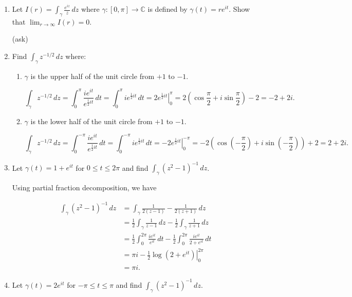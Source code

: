 \documentclass[11pt,oneside,english]{amsart}
\theoremstyle{definition}
\newcommand{\lom}[2]{\lim_{{#1}\rightarrow{#2}}}
\newcommand{\MB}[1]{\mathbb{#1}}
\begin{document}
\begin{enumerate}[leftmargin=*]
\item Let $\displaystyle I(r)=\int_\gamma\frac{e^{iz}}{z}\,dz$ where $\gamma:[0,\pi]\to\MB{C}$ is defined by $\gamma(t)=re^{it}$. Show that $\lom{r}{\infty} I(r)=0$.

(ask)

\item Find $\displaystyle \int_\gamma z^{-1/2}\,dz$ where:
\begin{enumerate}
\itemsep5mm
\item $\gamma$ is the upper half of the unit circle from $+1$ to $-1$.

\[
\int_\gamma z^{-1/2}\,dz=\int_0^\pi\frac{ie^{it}}{e^{\frac{1}{2}it}}\,dt=\int_0^\pi i e^{\frac{1}{2}it}\,dt=\left.2e^{\frac{1}{2}it}\right|_0^\pi=2\left(\cos\frac{\pi}{2}+i\sin\frac{\pi}{2}\right)-2=-2+2i.
\]

\item $\gamma$ is the lower half of the unit circle from $+1$ to $-1$.

\[
\int_\gamma z^{-1/2}\,dz=\int_0^{-\pi}\frac{ie^{it}}{e^{\frac{1}{2}it}}\,dt=\int_0^{-\pi} i e^{\frac{1}{2}it}\,dt=\left.-2e^{\frac{1}{2}it}\right|_0^{-\pi}=-2\left(\cos\left(-\frac{\pi}{2}\right)+i\sin\left(-\frac{\pi}{2}\right)\right)+2=2+2i.
\]

\end{enumerate}

\pagebreak

\setcounter{enumi}{19}

\item Let $\gamma(t)=1+e^{it}$ for $0\leq t\leq 2\pi$ and find $\int_\gamma (z^2-1)^{-1}\,dz$.

Using partial fraction decomposition, we have

\begin{align*}
\int_\gamma (z^2-1)^{-1}\,dz&=\int_\gamma\frac{1}{2(z-1)}-\frac{1}{2(z+1)}\,dz\\[2mm]
&=\frac{1}{2}\int_\gamma\frac{1}{z-1}\,dz-\frac{1}{2}\int_\gamma\frac{1}{z+1}\,dz\\[2mm]
&=\frac{1}{2}\int_0^{2\pi}\frac{ie^{it}}{e^{it}}\,dt-\frac{1}{2}\int_0^{2\pi}\frac{ie^{it}}{2+e^{it}}\,dt\\[2mm]
&=\pi i-\frac{1}{2}\left.\log(2+e^{it})\right|_0^{2\pi}\\[2mm]
&=\pi i.
\end{align*}

\item Let $\gamma(t)=2e^{it}$ for $-\pi\leq t\leq \pi$ and find $\int_\gamma (z^2-1)^{-1}\,dz$.


\end{enumerate}
\end{document}
